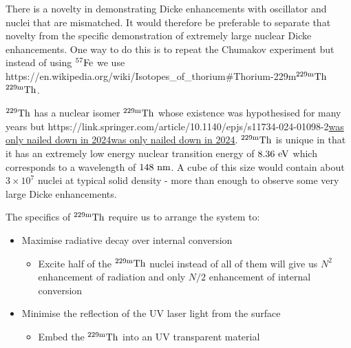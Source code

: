 \documentclass[
]{article}
\let\oldhref\href
\renewcommand{\href}[2]{\ifx#1\urlprefix\oldhref{#1}{#2}\else\uline{\oldhref{#1}{#2}}\fi}
\renewcommand{\[}{\begin{equation}}
\renewcommand{\]}{\end{equation}}
\providecommand{\tightlist}{%
  \setlength{\itemsep}{0pt}\setlength{\parskip}{0pt}}
\begin{document}
There is a novelty in demonstrating Dicke enhancements with oscillator
and nuclei that are mismatched. It would therefore be preferable to
separate that novelty from the specific demonstration of extremely large
nuclear Dicke enhancements. One way to do this is to repeat the Chumakov
experiment but instead of using \(\rm ^{57}Fe\) we use
\href{https://en.wikipedia.org/wiki/Isotopes_of_thorium\#Thorium-229m}{\(\rm ^{229m}Th\)}.

\(\rm ^{229}Th\) has a nuclear isomer \(\rm ^{229m}Th\) whose existence
was hypothesised for many years but
\href{https://link.springer.com/article/10.1140/epjs/s11734-024-01098-2}{was
only nailed down in 2024}. \(\rm ^{229m}Th\) is unique in that it has an
extremely low energy nuclear transition energy of \(8.36 \ \rm eV\)
which corresponds to a wavelength of \(148 \ \rm nm\). A cube of this
size would contain about \(3\times 10^7\) nuclei at typical solid
density - more than enough to observe some very large Dicke
enhancements.

The specifics of \(\rm ^{229m}Th\) require us to arrange the system to:

\begin{itemize}
\tightlist
\item
  Maximise radiative decay over internal conversion

  \begin{itemize}
  \tightlist
  \item
    Excite half of the \(\rm ^{229m}Th\) nuclei instead of all of them
    will give us \(N^2\) enhancement of radiation and only \(N/2\)
    enhancement of internal conversion
  \end{itemize}
\item
  Minimise the reflection of the UV laser light from the surface

  \begin{itemize}
  \tightlist
  \item
    Embed the \(\rm ^{229m}Th\) into an UV transparent material
  \end{itemize}
\end{itemize}

\printbibliography
\end{document}
